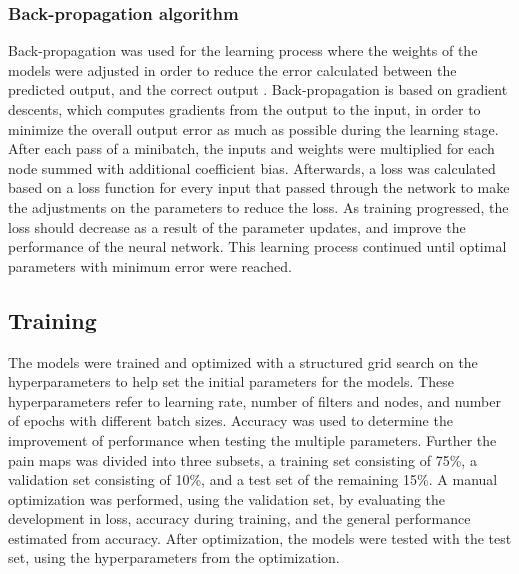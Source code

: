 \subsubsection*{\textbf{Back-propagation algorithm}}
Back-propagation was used for the learning process where the weights of the models were adjusted in order to reduce the error calculated between the predicted output, and the correct output \citep{Duda2000}. Back-propagation is based on gradient descents, which computes gradients from the output to the input, in order to minimize the overall output error as much as possible during the learning stage. 
After each pass of a minibatch, the inputs and weights were multiplied for each node summed with additional coefficient bias.\citep{LeCun1998, Hameed2016}
Afterwards, a loss was calculated based on a loss function for every input that passed through the network to make the adjustments on the parameters to reduce the loss. As training progressed, the loss should decrease as a result of the parameter updates, and improve the performance of the neural network.\citep{Goodfellow2016, LeCun2015, Duda2000} This learning process continued until optimal parameters with minimum error were reached.\citep{Hameed2016}

\subsection*{\textbf{Training}}
The models were trained and optimized with a structured grid search on the hyperparameters to help set the initial parameters for the models. These hyperparameters refer to learning rate, number of filters and nodes, and number of epochs with different batch sizes. Accuracy was used to determine the improvement of performance when testing the multiple parameters.
Further the pain maps was divided into three subsets, a training set consisting of 75\%, a validation set consisting of 10\%, and a test set of the remaining 15\%. A manual optimization was performed, using the validation set, by evaluating the development in loss, accuracy during training, and the general performance estimated from accuracy. After optimization, the models were tested with the test set, using the hyperparameters from the optimization.
 




